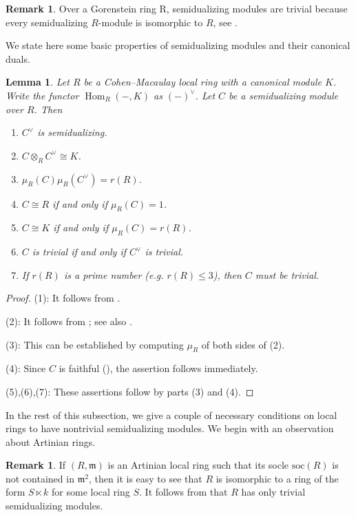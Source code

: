 \documentclass{amsart}
\DeclareMathOperator{\Hom}{Hom}
\theoremstyle{plain}
\newtheorem{lemma}[theorem]{Lemma}
\theoremstyle{definition}
\newtheorem{remark}[theorem]{Remark}
\numberwithin{theorem}{section}
\numberwithin{equation}{section}
\numberwithin{equation}{theorem}
\begin{document}
\begin{remark}

Over a Gorenstein ring R, semidualizing modules are trivial because every semidualizing $R$-module is isomorphic to $R$, see \cite[(8.6)]{C}. \end{remark}

We state here some basic properties of semidualizing modules and their canonical duals.

\begin{lemma} \label{dual}
Let $R$ be a Cohen--Macaulay local ring with a canonical module $K$.
Write the functor $\Hom_R(-,K)$ as $(-)^\vee$.
Let $C$ be a semidualizing module over $R$.
Then 
\begin{enumerate}[ \rm(1)]
\item $C^\vee$ is semidualizing.
\item $C \otimes_R C^\vee \cong K$.
\item $\mu_R(C)\mu_R(C^\vee)=r(R)$.
\item $C\cong R$ if and only if $\mu_R(C)=1$.
\item $C\cong K$ if and only if $\mu_R(C)=r(R)$.
\item $C$ is trivial if and only if $C^\vee$ is trivial.
\item If $r(R)$ is a prime number (e.g. $r(R) \le 3$), then $C$ must be trivial.
\end{enumerate}
\end{lemma}

\begin{proof}
(1): It follows from \cite[Corollary (2.12)]{C}.

(2): It follows from \cite[Theorem 3.1]{Ger2}; see also \cite[Fact 2.4]{JLSW}.

(3): This can be established by computing $\mu_R$ of both sides of (2).

(4): Since $C$ is faithful (\cite[Proposition 1.4.4]{SW10}), the assertion follows immediately.

(5),(6),(7): These assertions follow by parts (3) and (4).
\end{proof}

In the rest of this subsection, we give a couple of necessary conditions on local rings to have nontrivial semidualizing modules.
We begin with an observation about Artinian rings.

\begin{remark} \label{socle}
If $(R,\mathfrak{m})$ is an Artinian local ring such that its socle $\mathrm{soc}(R)$ is not contained in $\mathfrak{m}^2$, then it is easy to see that $R$ is isomorphic to a ring of the form $S \ltimes k$ for some local ring $S$. 
It follows from \cite[Corollary 3.5]{NY} that $R$ has only trivial semidualizing modules.
\end{remark}
\end{document}

